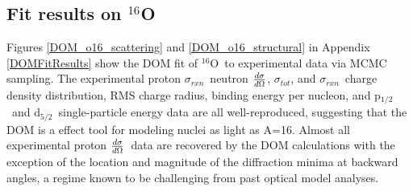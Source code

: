 \documentclass[twocolumn,secnumarabic,amssymb, nobibnotes, aps, prl,
superscriptaddress, nobalancelastpage]{revtex4}
\newcommand{\tot}{\ensuremath{\sigma_{tot}}}
\newcommand{\rxn}{\ensuremath{\sigma_{rxn}}}
\newcommand{\el}{\ensuremath{\frac{\lowercase{d}\sigma}{\lowercase{d}\Omega}}}
\newcommand{\oSix}{\ensuremath{^{16}}O}
\newcommand{\pOne}{p\ensuremath{_{1/2}}}
\newcommand{\dFive}{d\ensuremath{_{5/2}}}
\begin{document}


\subsection{Fit results on $^{16}$O}
Figures \ref{DOM_o16_scattering} and \ref{DOM_o16_structural} in Appendix
\ref{DOMFitResults} show the DOM fit of \oSix\ to experimental data via
MCMC sampling. The experimental proton \rxn\, neutron \el, \tot, 
and \rxn\, charge density distribution, RMS charge radius, binding energy per nucleon,
and \pOne\ and \dFive\ single-particle energy data are all well-reproduced,
suggesting that the DOM is a effect tool for modeling nuclei as light as A=16.
Almost all experimental proton \el\ data are recovered by the DOM
calculations with the exception of the location and magnitude of the diffraction
minima at backward angles, a regime known to be challenging from past
optical model analyses.
\end{document}

